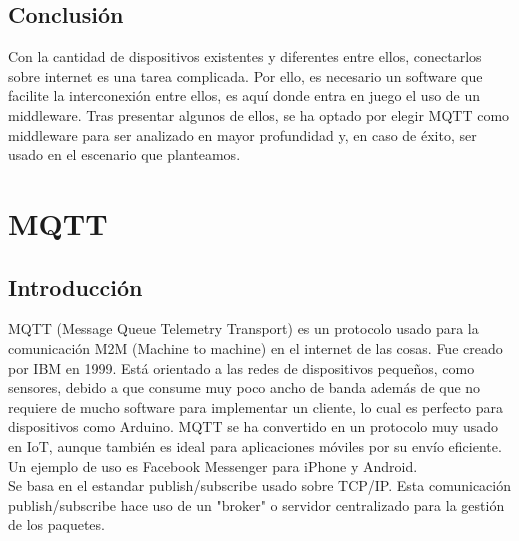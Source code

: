 \documentclass[12pt, twoside]{book}
\begin{document}
\section{Conclusión}
Con la cantidad de dispositivos existentes y diferentes entre ellos, conectarlos sobre internet es una tarea complicada. Por ello, es necesario un software que facilite la interconexión entre ellos, es aquí donde entra en juego el uso de un middleware. Tras presentar algunos de ellos, se ha optado por elegir MQTT como middleware para ser analizado en mayor profundidad y, en caso de éxito, ser usado en el escenario que planteamos.
\chapter{MQTT}
\section{Introducción}
MQTT (Message Queue Telemetry Transport) es un protocolo usado para la comunicación M2M (Machine to machine) en el internet de las cosas. Fue creado por IBM en 1999. Está orientado a las redes de dispositivos pequeños, como sensores, debido a que consume muy poco ancho de banda además de que no requiere de mucho software para implementar un cliente, lo cual es perfecto para dispositivos como Arduino. MQTT se ha convertido en un protocolo muy usado en IoT, aunque también es ideal para aplicaciones móviles por su envío eficiente. Un ejemplo de uso es Facebook Messenger para iPhone y Android.\\
Se basa en el estandar publish/subscribe usado sobre TCP/IP. Esta comunicación publish/subscribe hace uso de un "broker" o servidor centralizado para la gestión de los paquetes.
\end{document}

